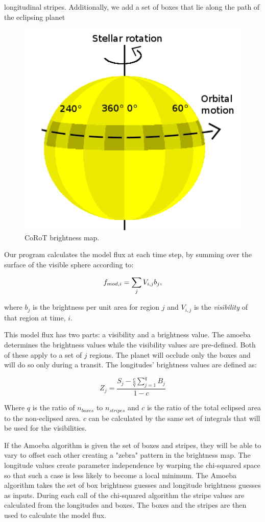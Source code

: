 longitudinal stripes. Additionally, we add a set of boxes that lie along the path of the eclipsing planet

\begin{figure}[h]
	\centering
	\includegraphics[width=.5\textwidth]{images/modelGeometry.png}
	\caption{CoRoT brightness map.}
	\label{CoRoT}
\end{figure}


Our program calculates the model flux at each time step, by summing over the surface of the visible sphere according to:

\begin{equation}
	\mbox{$f_{mod,i}$} = \sum_j V_{i,j}b_j, 
\end{equation}

where $b_j$ is the brightness per unit area for region $j$ and $V_{i,j}$ is the {\it visibility} of that region at time, $i$.


This model flux has two parts: a visibility and a brightness value. The amoeba determines the brightness values while the visibility values are pre-defined. Both of these apply to a set of $j$ regions. 
The planet will occlude only the boxes and will do so only during a transit. The longitudes' brightness values are defined as:

\begin{equation}
Z_j = \frac{S_j - \frac{c}{q} \sum_{j=1}^{q}B_j}{1- c}
\end{equation}

Where $q$ is the ratio of $n_{boxes}$ to $n_{stripes}$ and $c$ is the ratio of the total eclipsed area to the non-eclipsed area. $c$ can be calculated by the same set of integrals that will be used for the visibilities.

If the Amoeba algorithm is given the set of boxes and stripes, they will be able to vary to offset each other creating a "zebra" pattern in the brightness map.  The longitude values create parameter independence by warping the chi-squared space so that such a case is less likely to become a local minimum. The Amoeba algorithm takes the set of box brightness guesses and longitude brightness guesses as inputs. During each call of the chi-squared algorithm the stripe values are calculated from the longitudes and boxes. The boxes and the stripes are then used to calculate the model flux.


